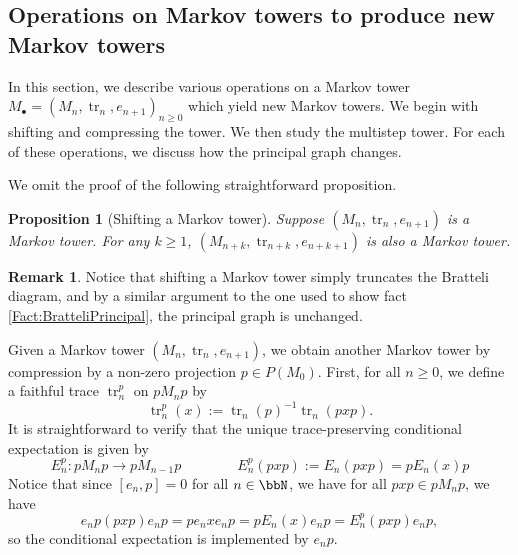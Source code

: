 \documentclass[11pt]{article}
\theoremstyle{plain}
\newtheorem{prop}[thm]{Proposition}
\theoremstyle{definition}
\newtheorem{remark}[thm]{Remark}
\DeclareMathOperator{\tr}{tr}
\begin{document}
\subsection{Operations on Markov towers to produce new Markov towers}
\label{sec:OperationsOnMarkovTowers}

In this section, we describe various operations on a Markov tower $M_\bullet = (M_n, \tr_n, e_{n+1})_{n\geq 0}$ which yield new Markov towers.
We begin with shifting and compressing the tower.
We then study the multistep tower.
For each of these operations, we discuss how the principal graph changes. 

We omit the proof of the following straightforward proposition.
\begin{prop}[Shifting a Markov tower]
\label{prop:ShiftMarkovTower}
Suppose $(M_n, \tr_n, e_{n+1})$ is a Markov tower.
For any $k\geq 1$, $(M_{n+k}, \tr_{n+k}, e_{n+k+1})$ is also a Markov tower.
\end{prop}

\begin{remark}
 \label{Rem:ShiftTowerEffects}
Notice that shifting a Markov tower simply truncates the Bratteli diagram, and by a similar argument to the one used to show fact \ref{Fact:BratteliPrincipal}, the principal graph is unchanged.
\end{remark}

Given a Markov tower $(M_n,\tr_n, e_{n+1})$, we obtain another Markov tower by compression by a non-zero projection $p\in P(M_0)$.
First, for all $n\geq 0$, we define a faithful trace $\tr_n^p$ on $pM_n p$ by
\begin{equation}
\label{eq:CompressedTrace}
\tr^p_n(x) := \tr_n(p)^{-1}\tr_n(pxp).
\end{equation}
It is straightforward to verify that the unique trace-preserving conditional expectation is given by 
\begin{equation}
\label{eq:CompressedConditionalExpectation}
E^p_n : pM_np \to pM_{n-1}p
\qquad
\qquad
E^p_n(pxp) := E_n(pxp) = pE_n(x)p
\end{equation}
Notice that since $[e_n,p] = 0$ for all $n\in \bbN$, we have for all $pxp \in pM_n p$, we have 
\begin{equation}
\label{eq:CompressionImplementsConditionalExpectation}
e_np (pxp) e_np = p e_nxe_np = pE_n(x)e_np = E_n^p(pxp)e_np,
\end{equation}
so the conditional expectation is implemented by $e_np$.
\end{document}
